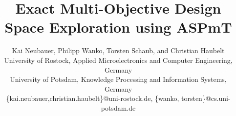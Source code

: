\documentclass[conference]{IEEEtran}
\makeatletter
\newcommand{\specificthanks}[1]{\@fnsymbol{#1}}%
\makeatother
\begin{document}
\title{Exact Multi-Objective Design Space Exploration using ASPmT}


\author{
	Kai Neubauer\textsuperscript{\specificthanks{1}}, Philipp Wanko\textsuperscript{\specificthanks{2}}, Torsten Schaub\textsuperscript{\specificthanks{2}}, and Christian Haubelt\textsuperscript{\specificthanks{1}}
	\\\small{\textsuperscript{\specificthanks{1}}University of Rostock, Applied Microelectronics and Computer Engineering, Germany}
	\\\small{\textsuperscript{\specificthanks{2}}University of Potsdam, Knowledge Processing and Information Systems, Germany}
	\\\footnotesize{\{kai.neubauer,christian.haubelt\}@uni-rostock.de}, \{wanko, torsten\}@cs.uni-potsdam.de%
}


\maketitle










\end{document}
